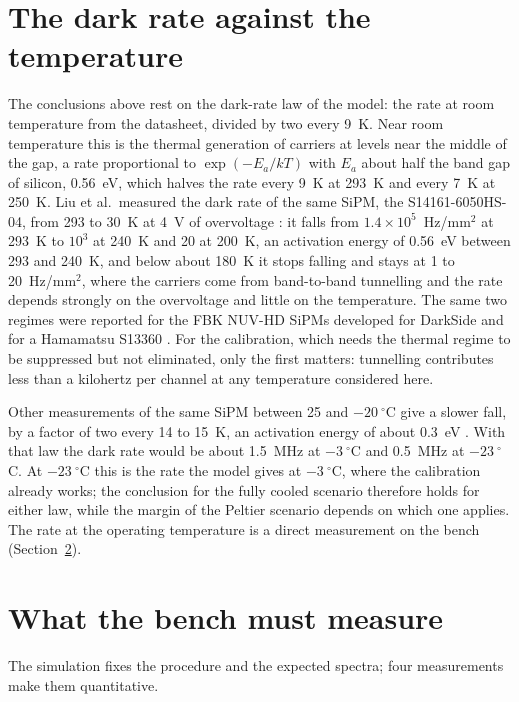 \documentclass[11pt]{article}
\begin{document}
\section{The dark rate against the temperature}
\label{sec:dcr}

The conclusions above rest on the dark-rate law of the model: the rate at
room temperature from the datasheet, divided by two every 9~K. Near room
temperature this is the thermal generation of carriers at levels near the
middle of the gap, a rate proportional to $\exp(-E_a/kT)$ with $E_a$ about
half the band gap of silicon, 0.56~eV, which halves the rate every 9~K at
293~K and every 7~K at 250~K. Liu et al.\ measured the dark rate of the
same SiPM, the S14161-6050HS-04, from 293 to 30~K at 4~V of overvoltage
\cite{liu40k}: it falls from $1.4 \times 10^5$~Hz/mm$^2$ at 293~K to
$10^3$ at 240~K and 20 at 200~K, an activation energy of 0.56~eV between
293 and 240~K, and below about 180~K it stops falling and stays at 1 to
20~Hz/mm$^2$, where the carriers come from band-to-band tunnelling and the
rate depends strongly on the overvoltage and little on the temperature.
The same two regimes were reported for the FBK NUV-HD SiPMs developed for
DarkSide \cite{fbkcryo} and for a Hamamatsu S13360 \cite{naisipm}. For the
calibration, which needs the thermal regime to be suppressed but not
eliminated, only the first matters: tunnelling contributes less than a
kilohertz per channel at any temperature considered here.

Other measurements of the same SiPM between 25 and $-20~^\circ$C give a
slower fall, by a factor of two every 14 to 15~K, an activation energy of
about 0.3~eV \cite{polar2,cattaneo14160}. With that law the dark rate would
be about 1.5~MHz at $-3~^\circ$C and 0.5~MHz at $-23~^\circ$C. At
$-23~^\circ$C this is the rate the model gives at $-3~^\circ$C, where the
calibration already works; the conclusion for the fully cooled scenario
therefore holds for either law, while the margin of the Peltier scenario
depends on which one applies. The rate at the operating temperature is a
direct measurement on the bench (Section~\ref{sec:bench}).

\section{What the bench must measure}
\label{sec:bench}

The simulation fixes the procedure and the expected spectra; four
measurements make them quantitative.
\end{document}
